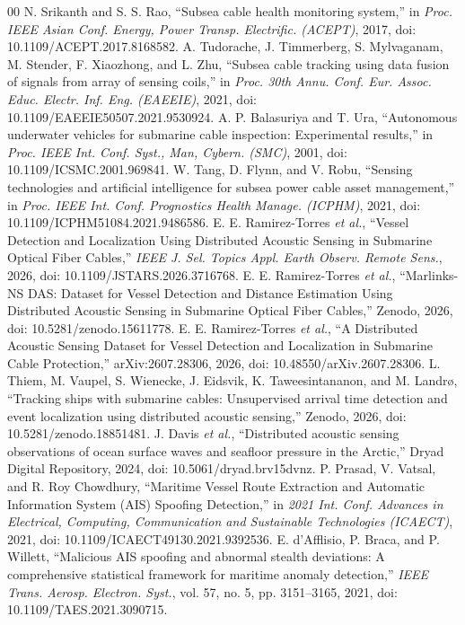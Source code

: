 \documentclass[conference]{IEEEtran}
\begin{document}
\begin{thebibliography}{00}
 N. Srikanth and S. S. Rao, ``Subsea cable health monitoring system,'' in \textit{Proc. IEEE Asian Conf. Energy, Power Transp. Electrific. (ACEPT)}, 2017, doi: 10.1109/ACEPT.2017.8168582.
 A. Tudorache, J. Timmerberg, S. Mylvaganam, M. Stender, F. Xiaozhong, and L. Zhu, ``Subsea cable tracking using data fusion of signals from array of sensing coils,'' in \textit{Proc. 30th Annu. Conf. Eur. Assoc. Educ. Electr. Inf. Eng. (EAEEIE)}, 2021, doi: 10.1109/EAEEIE50507.2021.9530924.
 A. P. Balasuriya and T. Ura, ``Autonomous underwater vehicles for submarine cable inspection: Experimental results,'' in \textit{Proc. IEEE Int. Conf. Syst., Man, Cybern. (SMC)}, 2001, doi: 10.1109/ICSMC.2001.969841.
 W. Tang, D. Flynn, and V. Robu, ``Sensing technologies and artificial intelligence for subsea power cable asset management,'' in \textit{Proc. IEEE Int. Conf. Prognostics Health Manage. (ICPHM)}, 2021, doi: 10.1109/ICPHM51084.2021.9486586.
 E. E. Ramirez-Torres \textit{et al.}, ``Vessel Detection and Localization Using Distributed Acoustic Sensing in Submarine Optical Fiber Cables,'' \textit{IEEE J. Sel. Topics Appl. Earth Observ. Remote Sens.}, 2026, doi: 10.1109/JSTARS.2026.3716768.
 E. E. Ramirez-Torres \textit{et al.}, ``Marlinks-NS DAS: Dataset for Vessel Detection and Distance Estimation Using Distributed Acoustic Sensing in Submarine Optical Fiber Cables,'' Zenodo, 2026, doi: 10.5281/zenodo.15611778.
 E. E. Ramirez-Torres \textit{et al.}, ``A Distributed Acoustic Sensing Dataset for Vessel Detection and Localization in Submarine Cable Protection,'' arXiv:2607.28306, 2026, doi: 10.48550/arXiv.2607.28306.
 L. Thiem, M. Vaupel, S. Wienecke, J. Eidsvik, K. Taweesintananon, and M. Landr{\o}, ``Tracking ships with submarine cables: Unsupervised arrival time detection and event localization using distributed acoustic sensing,'' Zenodo, 2026, doi: 10.5281/zenodo.18851481.
 J. Davis \textit{et al.}, ``Distributed acoustic sensing observations of ocean surface waves and seafloor pressure in the Arctic,'' Dryad Digital Repository, 2024, doi: 10.5061/dryad.brv15dvnz.
 P. Prasad, V. Vatsal, and R. Roy Chowdhury, ``Maritime Vessel Route Extraction and Automatic Information System (AIS) Spoofing Detection,'' in \textit{2021 Int. Conf. Advances in Electrical, Computing, Communication and Sustainable Technologies (ICAECT)}, 2021, doi: 10.1109/ICAECT49130.2021.9392536.
 E. d'Afflisio, P. Braca, and P. Willett, ``Malicious AIS spoofing and abnormal stealth deviations: A comprehensive statistical framework for maritime anomaly detection,'' \textit{IEEE Trans. Aerosp. Electron. Syst.}, vol. 57, no. 5, pp. 3151--3165, 2021, doi: 10.1109/TAES.2021.3090715.

\end{thebibliography}
\end{document}
